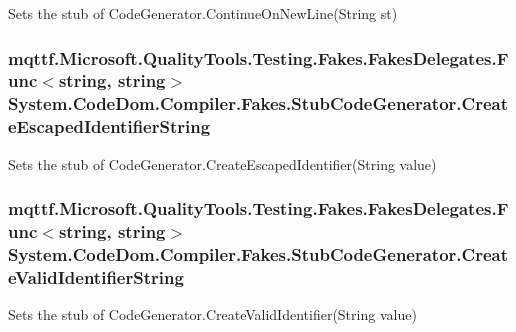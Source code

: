 Sets the stub of Code\-Generator.\-Continue\-On\-New\-Line(\-String st)

\hypertarget{class_system_1_1_code_dom_1_1_compiler_1_1_fakes_1_1_stub_code_generator_a7e3deec40164be43ddd66c18ce1ef295}{
\subsubsection[{Create\-Escaped\-Identifier\-String}]{\setlength{\rightskip}{0pt plus 5cm}mqttf.\-Microsoft.\-Quality\-Tools.\-Testing.\-Fakes.\-Fakes\-Delegates.\-Func$<$string, string$>$ System.\-Code\-Dom.\-Compiler.\-Fakes.\-Stub\-Code\-Generator.\-Create\-Escaped\-Identifier\-String}}\label{class_system_1_1_code_dom_1_1_compiler_1_1_fakes_1_1_stub_code_generator_a7e3deec40164be43ddd66c18ce1ef295}


Sets the stub of Code\-Generator.\-Create\-Escaped\-Identifier(\-String value)

\hypertarget{class_system_1_1_code_dom_1_1_compiler_1_1_fakes_1_1_stub_code_generator_ab602ca4976742c5c3a1c8db5f232b407}{
\subsubsection[{Create\-Valid\-Identifier\-String}]{\setlength{\rightskip}{0pt plus 5cm}mqttf.\-Microsoft.\-Quality\-Tools.\-Testing.\-Fakes.\-Fakes\-Delegates.\-Func$<$string, string$>$ System.\-Code\-Dom.\-Compiler.\-Fakes.\-Stub\-Code\-Generator.\-Create\-Valid\-Identifier\-String}}\label{class_system_1_1_code_dom_1_1_compiler_1_1_fakes_1_1_stub_code_generator_ab602ca4976742c5c3a1c8db5f232b407}


Sets the stub of Code\-Generator.\-Create\-Valid\-Identifier(\-String value)

